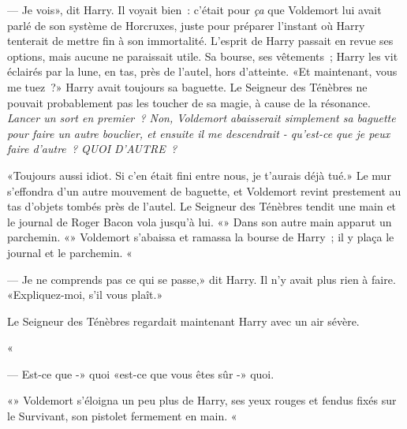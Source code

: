 --- Je vois», dit Harry. Il voyait bien~: c'était pour \emph{ça} que Voldemort lui avait parlé de son système de Horcruxes, juste pour préparer l'instant où Harry tenterait de mettre fin à son immortalité. L'esprit de Harry passait en revue ses options, mais aucune ne paraissait utile. Sa bourse, ses vêtements~; Harry les vit éclairés par la lune, en tas, près de l'autel, hors d'atteinte. «Et maintenant, vous me tuez~?» Harry avait toujours sa baguette. Le Seigneur des Ténèbres ne pouvait probablement pas les toucher de sa magie, à cause de la résonance. \emph{Lancer un sort en premier~? Non, Voldemort abaisserait simplement sa baguette pour faire un autre bouclier, et ensuite il me descendrait - qu'est-ce que je peux faire d'autre~? QUOI D'AUTRE~?}

«Toujours aussi idiot. Si c'en était fini entre nous, je t'aurais déjà tué.» Le mur s'effondra d'un autre mouvement de baguette, et Voldemort revint prestement au tas d'objets tombés près de l'autel. Le Seigneur des Ténèbres tendit une main et le journal de Roger Bacon vola jusqu'à lui. «» Dans son autre main apparut un parchemin. «» Voldemort s'abaissa et ramassa la bourse de Harry~; il y plaça le journal et le parchemin. «

--- Je ne comprends pas ce qui se passe,» dit Harry. Il n'y avait plus rien à faire. «Expliquez-moi, s'il vous plaît.»

Le Seigneur des Ténèbres regardait maintenant Harry avec un air sévère.

«

--- Est-ce que -» quoi «est-ce que vous êtes sûr -» quoi.

«» Voldemort s'éloigna un peu plus de Harry, ses yeux rouges et fendus fixés sur le Survivant, son pistolet fermement en main. «

